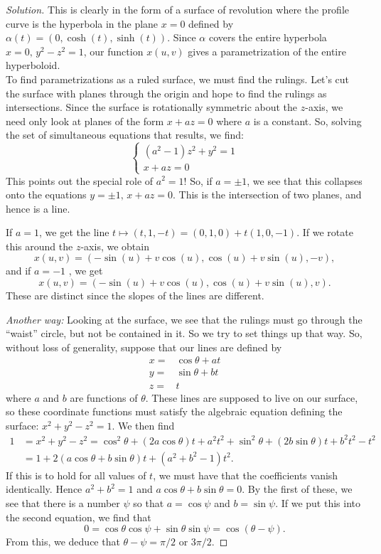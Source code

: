 \documentclass[Shifrin_Solutions_Spring_2018]{subfiles}
\begin{document}
\begin{proof}[Solution] This is clearly in the form of a surface of revolution where the profile curve is the hyperbola in the plane $x=0$ defined by $\alpha(t) = (0 ,\cosh(t), \sinh(t))$.  Since $\alpha$ covers the entire hyperbola $x=0, \,  y^2-z^2=1$, our function $x(u,v)$ gives a parametrization of the entire hyperboloid.\\

To find parametrizations as a ruled surface, we must find the rulings. Let's cut the surface with planes through the origin and hope to find the rulings as intersections. Since the surface is rotationally symmetric about the $z$-axis, we need only look at planes of the form $x+az=0$ where $a$ is a constant. So, solving the set of simultaneous equations that results, we find:
\[
\left\{ \begin{array}{l} (a^2-1)z^2 + y^2 = 1 \\ x+az = 0 \end{array}\right.
\]
This points out the special role of $a^2=1$! So, if $a = \pm 1$, we see that this collapses onto the equations $y = \pm 1, \, x+az=0$. This is the intersection of two planes, and hence is a line.

If $a=1$, we get the line $t \mapsto (t,1,-t)= (0,1,0) + t(1,0,-1)$. If we rotate this around the $z$-axis, we obtain
\[
x(u,v) = \left( -\sin(u) + v\cos(u) , \cos(u) + v \sin(u) , -v\right),
\]
and if $a=-1$ , we get
\[
x(u,v) = \left( -\sin(u) + v\cos(u) , \cos(u) + v \sin(u) , v\right) .
\]
These are distinct since the slopes of the lines are different. \\


\noindent\emph{Another way:} Looking at the surface, we see that the rulings must go through the ``waist'' circle, but not be contained in it. So we try to set things up that way. So, without loss of generality, suppose that our lines are defined by
\begin{align*}
x = &\cos\theta + a t \\
y = &\sin \theta + b t \\
z = &t
\end{align*}
where $a$ and $b$ are functions of $\theta$. These lines are supposed to live on our surface, so these coordinate functions must satisfy the algebraic equation defining the surface: $x^2+y^2-z^2 = 1$. We then find
\[
\begin{split}
1 & = x^2+y^2-z^2  = \cos^2\theta + (2a\cos\theta) t  + a^2 t^2 + \sin^2\theta + (2b\sin\theta) t + b^2 t^2 - t^2\\
	&= 1+ 2(a\cos\theta + b\sin\theta) t + (a^2+b^2-1)t^2.
\end{split}
\]
If this is to hold for all values of $t$, we must have that the coefficients vanish identically. Hence $a^2+b^2=1$ and $a\cos\theta +b\sin\theta =0$. By the first of these, we see that there is a number $\psi$ so that $a = \cos \psi$ and $b=\sin \psi$. If we put this into the second equation, we find that
\[
0 = \cos\theta\cos\psi + \sin\theta\sin\psi = \cos(\theta-\psi).
\]
From this, we deduce that $\theta-\psi = \pi/2$ or $3\pi/2$.


\end{proof}
\end{document}
